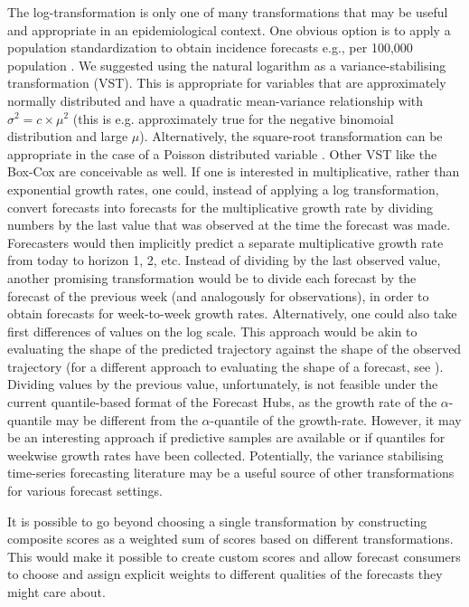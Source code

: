 \documentclass[10pt,letterpaper]{article}
\begin{document}
The log-transformation is only one of many transformations that may be useful and appropriate in an epidemiological context. One obvious option is to apply a population standardization to obtain incidence forecasts e.g., per 100,000 population \cite{abbottEvaluatingEpidemiologicallyMotivated2022}. 
We suggested using the natural logarithm as a variance-stabilising transformation (VST). This is appropriate for variables that are approximately normally distributed and have a quadratic mean-variance relationship with $\sigma^2 = c \times \mu^2$ (this is e.g. approximately true for the negative binomoial distribution and large $\mu$). Alternatively, the square-root transformation can be appropriate in the case of a Poisson distributed variable \cite{dunnGeneralizedLinearModels2018}. Other VST like the Box-Cox \cite{boxAnalysisTransformations1964} are conceivable as well.
If one is interested in multiplicative, rather than exponential growth rates, one could, instead of applying a log transformation, convert forecasts into forecasts for the multiplicative growth rate by dividing numbers by the last value that was observed at the time the forecast was made. Forecasters would then implicitly predict a separate multiplicative growth rate from today to horizon 1, 2, etc. 
Instead of dividing by the last observed value, another promising transformation would be to divide each forecast by the forecast of the previous week (and analogously for observations), in order to obtain forecasts for week-to-week growth rates. Alternatively, one could also take first differences of values on the log scale. This approach would be akin to evaluating the shape of the predicted trajectory against the shape of the observed trajectory (for a different approach to evaluating the shape of a forecast, see \cite{srivastavaShapebasedEvaluationEpidemic2022}). Dividing values by the previous value, unfortunately, is not feasible under the current quantile-based format of the Forecast Hubs, as the growth rate of the $\alpha$-quantile may be different from the $\alpha$-quantile of the growth-rate. However, it may be an interesting approach if predictive samples are available or if quantiles for weekwise growth rates have been collected. Potentially, the variance stabilising time-series forecasting literature may be a useful source of other transformations for various forecast settings. 

It is possible to go beyond choosing a single transformation by constructing composite scores as a weighted sum of scores based on different transformations. This would make it possible to create custom scores and allow forecast consumers to choose and assign explicit weights to different qualities of the forecasts they might care about.
\end{document}
